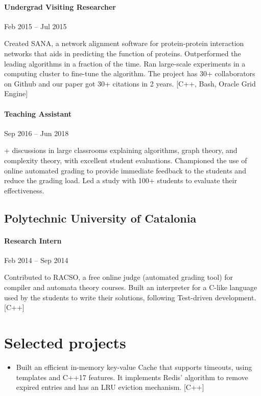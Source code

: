 \documentclass[letterpaper,10pt,oneside]{article}
\begin{document}
\paragraph*{Undergrad Visiting Researcher} \hfill Feb 2015 -- Jul 2015

\vspace{2px}
\noindent Created SANA, a network alignment software for protein-protein interaction networks that aids in predicting the function of proteins. Outperformed the leading algorithms in a fraction of the time. Ran large-scale experiments in a computing cluster to fine-tune the algorithm. The project has 30+ collaborators on Github and our paper got 30+ citations in 2 years. [C++, Bash, Oracle Grid Engine]
	 
\paragraph*{Teaching Assistant} \hfill Sep 2016 -- Jun 2018

\vspace{2px}
+ discussions in large classrooms explaining algorithms, graph theory, and complexity theory, with excellent student evaluations. Championed the use of online automated grading to provide immediate feedback to the students and reduce the grading load. Led a study with 100+ students to evaluate their effectiveness.
\vspace{3px}
\subsection*{Polytechnic University of Catalonia}
\vspace{-2px}
\paragraph*{Research Intern} \hfill Feb 2014 -- Sep 2014

\vspace{2px}
\noindent Contributed to RACSO, a free online judge (automated grading tool) for compiler and automata theory courses. Built an interpreter for a C-like language used by the students to write their solutions, following Test-driven development. [C++]

\section*{Selected projects}
\begin{itemize}[leftmargin=15px]
	\item Built an efficient in-memory key-value Cache that supports timeouts, using templates and C++17 features. It implements Redis' algorithm to remove expired entries and has an LRU eviction mechanism. [C++]
\end{itemize}
\end{document}
